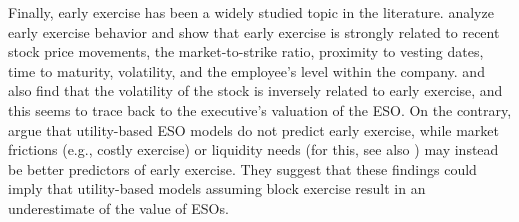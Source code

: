     Finally, early exercise has been a widely studied topic in the literature. \cite{huddart1996employee} analyze early exercise behavior and show that early exercise is strongly related to recent stock price movements, the market-to-strike ratio, proximity to vesting dates, time to maturity, volatility, and the employee's level within the company. \cite{heron2017stock} and \cite{izhakian2017risk} also find that the volatility of the stock is inversely related to early exercise, and this seems to trace back to the executive's valuation of the ESO. On the contrary, \cite{grasselli2009risk} argue that utility-based ESO models do not predict early exercise, while market frictions (e.g., costly exercise) or liquidity needs (for this, see also \cite{murphy2019employees}) may instead be better predictors of early exercise. They suggest that these findings could imply that utility-based models assuming block exercise result in an underestimate of the value of ESOs.

